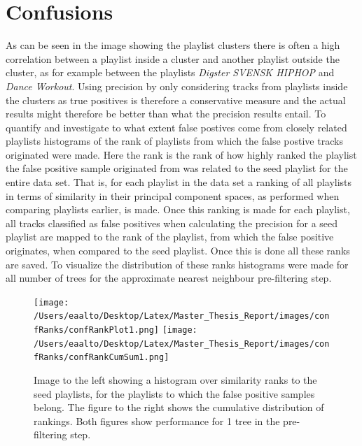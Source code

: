 \documentclass[a4paper,11pt]{kth-mag}
\begin{document}
\section{Confusions}
As can be seen in the image showing the playlist clusters there is often a high correlation between a playlist inside a cluster and another playlist outside the cluster, as for example between the playlists \textit{Digster SVENSK HIPHOP} and \textit{Dance Workout}. Using precision by only considering tracks from playlists inside the clusters as true positives is therefore a conservative measure and the actual results might therefore be better than what the precision results entail. To quantify and investigate to what extent false postives come from closely related playlists histograms of the rank of playlists from which the false postive tracks originated were made. Here the rank is the rank of how highly ranked the playlist the false positive sample originated from was related to the seed playlist for the entire data set. That is, for each playlist in the data set a ranking of all playlists in terms of similarity in their principal component spaces, as performed when comparing playlists earlier, is made. Once this ranking is made for each playlist, all tracks classified as false positives when calculating the precision for a seed playlist are mapped to the rank of the playlist, from which the false positive originates, when compared to the seed playlist. Once this is done all these ranks are saved. To visualize the distribution of these ranks histograms were made for all number of trees for the approximate nearest neighbour pre-filtering step.

\begin{figure}
\centering
\texttt{[image: /Users/eaalto/Desktop/Latex/Master\_Thesis\_Report/images/confRanks/confRankPlot1.png]}
\texttt{[image: /Users/eaalto/Desktop/Latex/Master\_Thesis\_Report/images/confRanks/confRankCumSum1.png]}
\caption{Image to the left showing a histogram over similarity ranks to the seed playlists, for the playlists to which the false positive samples belong. The figure to the right shows the cumulative distribution of rankings. Both figures show performance for 1 tree in the pre-filtering step.}
\end{figure}
\end{document}
